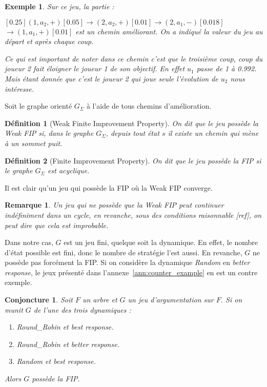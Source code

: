 \documentclass[11pt]{article}
\newtheorem{conjoncture}{Conjoncture}[section]
\theoremstyle{defi}
\newtheorem{definition}{Définition}[section]
\theoremstyle{not}
\theoremstyle{prob}
\newtheorem{example}{Exemple}[section]
\newtheorem{remarque}{Remarque}[section]
\begin{document}
\begin{example}
        Sur ce jeu, la partie :

        \scriptsize$[0.25]$\normalsize$(1, a_2, +)$\scriptsize$[0.05]$\normalsize$ \rightarrow (2, a_2, +)$\scriptsize$[0.01]$\normalsize$ \rightarrow (2, a_1, -)$\scriptsize$[0.018]$\normalsize$ \rightarrow (1, a_1, +)$\scriptsize$[0.01]$ \normalsize est un chemin améliorant.
        On a indiqué la valeur du jeu au départ et après chaque coup.

        Ce qui est important de noter dans ce chemin c'est que le troisième coup, coup du joueur 2 fait éloigner le joueur 1 de son objectif. En effet $u_1$ passe de 1 à 0.992. Mais étant donnée que c'est le joueur 2 qui joue seule l'évolution de $u_2$ nous intéresse.

      \end{example}

      Soit le graphe orienté $G_\Sigma$ à l'aide de tous chemins d'amélioration.

      \begin{definition}[Weak Finite Improvement Property]
        On dit que le jeu possède la Weak FIP si, dans le graphe $G_\Sigma$, depuis tout état $s$ il existe un chemin qui mène à un sommet puit.
      \end{definition}

      \begin{definition}[Finite Improvement Property]
        On dit que le jeu possède la FIP si le graphe $G_\Sigma$ est acyclique.
      \end{definition}

      Il est clair qu'un jeu qui possède la FIP où la Weak FIP converge.

      \begin{remarque}
        Un jeu qui ne possède que la Weak FIP peut continuer indéfiniment dans un cycle, en revanche, sous des conditions raisonnable [ref], on peut dire que cela est improbable.
      \end{remarque}

      Dans notre cas, $G$ est un jeu fini, quelque soit la dynamique. En effet, le nombre d'état possible est fini, donc le nombre de stratégie l'est aussi.
      En revanche, $G$ ne possède pas forcément la FIP. Si on considère la dynamique \emph{Random} en \emph{better response}, le jeux présenté dans l'annexe~\ref{ann:counter_example} en est un contre exemple.

      \begin{conjoncture}
        Soit $F$ un arbre et $G$ un jeu d'argumentation sur $F$. Si on munit $G$ de l'une des trois dynamiques :
        \begin{enumerate}
          \item \emph{Round\_Robin} et \emph{best response}.
          \item \emph{Round\_Robin} et \emph{better response}.
          \item \emph{Random} et \emph{best response}.
        \end{enumerate}
        Alors $G$ possède la FIP.
      \end{conjoncture}
\end{document}

